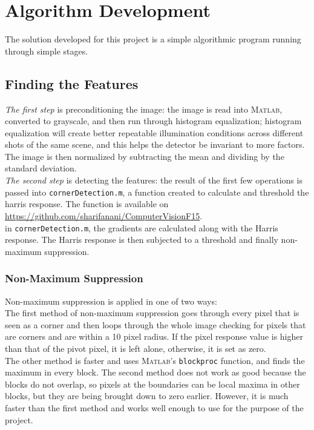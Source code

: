 \documentclass[10pt,twocolumn,letterpaper]{article}
\begin{document}
\section{Algorithm Development}
The solution developed for this project is a simple algorithmic program running through simple stages.\\ 
\subsection{Finding the Features}
\emph{The first step} is preconditioning the image: the image is read into \textsc{Matlab}, converted to grayscale, and then run through histogram equalization; histogram equalization will create better repeatable illumination conditions across different shots of the same scene, and this helps the detector be invariant to more factors. The image is then normalized by subtracting the mean and dividing by the standard deviation.\\
\emph{The second step} is detecting the features: the result of the first few operations is passed into \texttt{cornerDetection.m}, a function created to calculate and threshold the harris response. The function is available on \url{https://github.com/sharifanani/ComputerVisionF15}. \\
in \texttt{cornerDetection.m}, the gradients are calculated along with the Harris response. The Harris response is then subjected to a threshold and finally non-maximum suppression.
\subsubsection{Non-Maximum Suppression}
Non-maximum suppression is applied in one of two ways: \\
The first method of non-maximum suppression goes through every pixel that is seen as a corner and then loops through the whole image checking for pixels that are corners and are within a 10 pixel radius. If the pixel response value is higher than that of the pivot pixel, it is left alone, otherwise, it is set as zero.\\
The other method is faster and uses \textsc{Matlab}'s \texttt{blockproc} function, and finds the maximum in every block. The second method does not work as good because the blocks do not overlap, so pixels at the boundaries can be local maxima in other blocks, but they are being brought down to zero earlier. However, it is much faster than the first method and works well enough to use for the purpose of the project.
\end{document}
